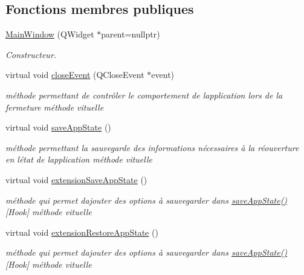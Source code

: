 \subsection*{Fonctions membres publiques}
\begin{DoxyCompactItemize}
\item 
\hyperlink{class_main_window_a996c5a2b6f77944776856f08ec30858d}{Main\+Window} (Q\+Widget $\ast$parent=nullptr)
\begin{DoxyCompactList}\small\item\em Constructeur. \end{DoxyCompactList}\item 
virtual void \hyperlink{class_main_window_a4e20a4a065fbb0e4d3532a45a0a91425}{close\+Event} (Q\+Close\+Event $\ast$event)
\begin{DoxyCompactList}\small\item\em méthode permettant de contrôler le comportement de l\textquotesingle{}application lors de la fermeture méthode vituelle \end{DoxyCompactList}\item 
virtual void \hyperlink{class_main_window_a94b693e3fa35f35ba200d2427b9cd419}{save\+App\+State} ()
\begin{DoxyCompactList}\small\item\em méthode permettant la sauvegarde des informations nécessaires à la réouverture en l\textquotesingle{}état de l\textquotesingle{}application méthode vituelle \end{DoxyCompactList}\item 
virtual void \hyperlink{class_main_window_a21fadb05c4f0a6686460bdd4b44896db}{extension\+Save\+App\+State} ()
\begin{DoxyCompactList}\small\item\em méthode qui permet d\textquotesingle{}ajouter des options à sauvegarder dans \hyperlink{class_main_window_a94b693e3fa35f35ba200d2427b9cd419}{save\+App\+State()} \mbox{[}Hook\mbox{]} méthode vituelle \end{DoxyCompactList}\item 
virtual void \hyperlink{class_main_window_a7c6d8bcd0b42176c57f22c166925b7d1}{extension\+Restore\+App\+State} ()
\begin{DoxyCompactList}\small\item\em méthode qui permet d\textquotesingle{}ajouter des options à sauvegarder dans \hyperlink{class_main_window_a94b693e3fa35f35ba200d2427b9cd419}{save\+App\+State()} \mbox{[}Hook\mbox{]} méthode vituelle \end{DoxyCompactList}\item 

\end{DoxyCompactItemize}
